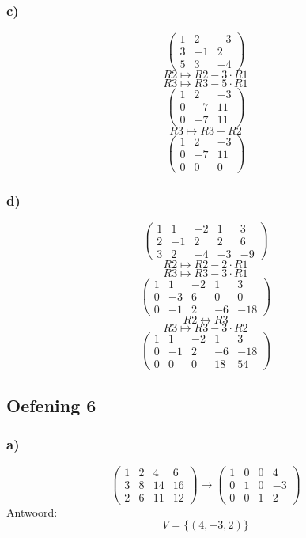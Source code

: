 \documentclass[lineaire_algebra_oplossingen.tex]{subfiles}
\begin{document}
\subsubsection*{c)}
\[
\begin{pmatrix}
1 &  2 &  -3\\
3 &  -1 &  2\\
5 &  3 &  -4
\end{pmatrix}
\]
\[ R2 \longmapsto R2 -3\cdot R1\]
\[ R3 \longmapsto R3 -5\cdot R1\]
\[
\begin{pmatrix}
1 &  2 &  -3\\
0 &  -7 &  11\\
0 &  -7 &  11
\end{pmatrix}
\]
\[ R3 \longmapsto R3 - R2\]
\[
\begin{pmatrix}
1 &  2 &  -3\\
0 &  -7 &  11\\
0 &  0 &  0
\end{pmatrix}
\]

\subsubsection*{d)}
\[
\begin{pmatrix}
1 &  1 &  -2 & 1 & 3\\
2 &  -1 &  2 & 2 & 6\\
3 &  2 &  -4 & -3 & -9
\end{pmatrix}
\]
\[ R2 \longmapsto R2 -2\cdot R1\]
\[ R3 \longmapsto R3 -3\cdot R1\]
\[
\begin{pmatrix}
1 &  1 &  -2 & 1 & 3\\
0 &  -3 &  6 & 0 & 0\\
0 &  -1 &  2 & -6 & -18
\end{pmatrix}
\]
\[ R2 \leftrightarrow R3\]
\[ R3 \longmapsto R3 -3\cdot R2\]
\[
\begin{pmatrix}
1 &  1 &  -2 & 1 & 3\\
0 &  -1 &  2 & -6 & -18\\
0 &  0 &  0 & 18 & 54
\end{pmatrix}
\]

\subsection{Oefening 6}
\subsubsection*{a)}
\[
\begin{pmatrix}
1 &  2 &  4 &  6\\
3 &  8 & 14 & 16\\
2 &  6 & 11 & 12
\end{pmatrix}
\longrightarrow
\begin{pmatrix}
1 &  0 &  0 &  4\\
0 &  1 &  0 & -3\\
0 &  0 &  1 &  2
\end{pmatrix}
\]
Antwoord:
\[
V=\{(4,-3,2)\}
\]
\end{document}
